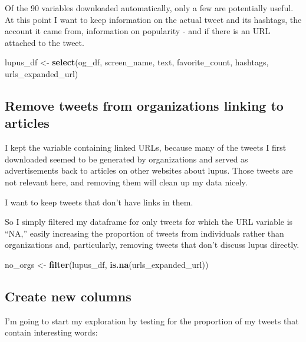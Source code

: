 \documentclass[]{article}
\newenvironment{Shaded}{\begin{snugshade}}{\end{snugshade}}
\newcommand{\KeywordTok}[1]{\textcolor[rgb]{0.13,0.29,0.53}{\textbf{#1}}}
\newcommand{\NormalTok}[1]{#1}
\newcommand{\StringTok}[1]{\textcolor[rgb]{0.31,0.60,0.02}{#1}}
\begin{document}
Of the 90 variables downloaded automatically, only a few are potentially
useful. At this point I want to keep information on the actual tweet and
its hashtags, the account it came from, information on popularity - and
if there is an URL attached to the tweet.

\begin{Shaded}
\begin{Highlighting}[]
\NormalTok{lupus_df <-}\StringTok{ }\KeywordTok{select}\NormalTok{(og_df, screen_name, text, favorite_count, hashtags, urls_expanded_url)}
\end{Highlighting}
\end{Shaded}

\hypertarget{remove-tweets-from-organizations-linking-to-articles}{%
\subsection{Remove tweets from organizations linking to
articles}\label{remove-tweets-from-organizations-linking-to-articles}}

I kept the variable containing linked URLs, because many of the tweets I
first downloaded seemed to be generated by organizations and served as
advertisements back to articles on other websites about lupus. Those
tweets are not relevant here, and removing them will clean up my data
nicely.

I want to keep tweets that don't have links in them.

So I simply filtered my dataframe for only tweets for which the URL
variable is ``NA,'' easily increasing the proportion of tweets from
individuals rather than organizations and, particularly, removing tweets
that don't discuss lupus directly.

\begin{Shaded}
\begin{Highlighting}[]
\NormalTok{no_orgs <-}\StringTok{ }\KeywordTok{filter}\NormalTok{(lupus_df, }\KeywordTok{is.na}\NormalTok{(urls_expanded_url))}
\end{Highlighting}
\end{Shaded}

\hypertarget{create-new-columns}{%
\subsection{Create new columns}\label{create-new-columns}}

I'm going to start my exploration by testing for the proportion of my
tweets that contain interesting words:
\end{document}
